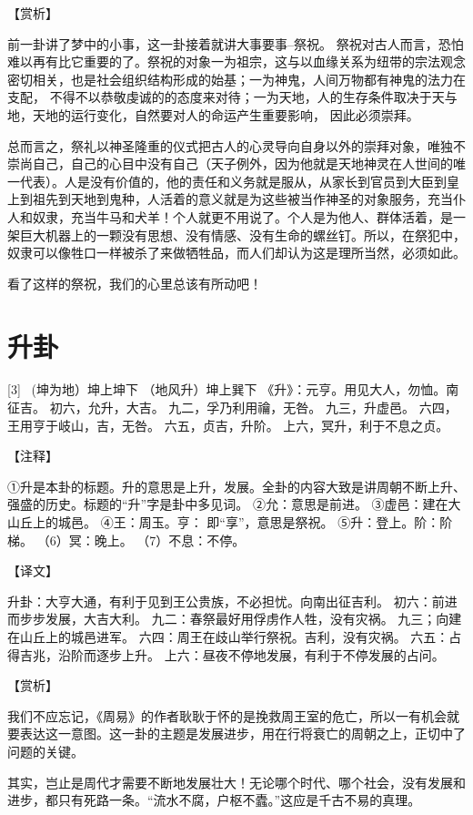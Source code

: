 \documentclass[12pt,UTF8]{ctexbook}
\begin{document}
【赏析】

前一卦讲了梦中的小事，这一卦接着就讲大事要事--祭祝。 祭祝对古人而言，恐怕难以再有比它重要的了。祭祝的对象一为祖宗，这与以血缘关系为纽带的宗法观念密切相关，也是社会组织结构形成的始基；一为神鬼，人间万物都有神鬼的法力在支配， 不得不以恭敬虔诚的的态度来对待；一为天地，人的生存条件取决于天与地，天地的运行变化，自然要对人的命运产生重要影响， 因此必须崇拜。

总而言之，祭礼以神圣隆重的仪式把古人的心灵导向自身以外的崇拜对象，唯独不崇尚自己，自己的心目中没有自己（天子例外，因为他就是天地神灵在人世间的唯一代表）。人是没有价值的，他的责任和义务就是服从，从家长到官员到大臣到皇上到祖先到天地到鬼种，人活着的意义就是为这些被当作神圣的对象服务，充当仆人和奴隶，充当牛马和犬羊！个人就更不用说了。个人是为他人、群体活着，是一架巨大机器上的一颗没有思想、没有情感、没有生命的螺丝钉。所以，在祭犯中，奴隶可以像牲口一样被杀了来做牺牲品，而人们却认为这是理所当然，必须如此。

看了这样的祭祝，我们的心里总该有所动吧！

\chapter{升卦}
[3] \ (坤为地）坤上坤下
（地风升）坤上巽下
《升》：元亨。用见大人，勿恤。南征吉。
初六，允升，大吉。
九二，孚乃利用禴，无咎。
九三，升虚邑。
六四，王用亨于岐山，吉，无咎。
六五，贞吉，升阶。
上六，冥升，利于不息之贞。

【注释】

①升是本卦的标题。升的意思是上升，发展。全卦的内容大致是讲周朝不断上升、强盛的历史。标题的“升”字是卦中多见词。
②允：意思是前进。
③虚邑：建在大山丘上的城邑。
④王：周玉。亨： 即“享”，意思是祭祝。
⑤升：登上。阶：阶梯。
（6）冥：晚上。
（7）不息：不停。

【译文】

升卦：大亨大通，有利于见到王公贵族，不必担忧。向南出征吉利。
初六：前进而步步发展，大吉大利。
九二：春祭最好用俘虏作人牲，没有灾祸。
九三；向建在山丘上的城邑进军。
六四：周王在歧山举行祭祝。吉利，没有灾祸。
六五：占得吉兆，沿阶而逐步上升。
上六：昼夜不停地发展，有利于不停发展的占问。

【赏析】

我们不应忘记，《周易》的作者耿耿于怀的是挽救周王室的危亡，所以一有机会就要表达这一意图。这一卦的主题是发展进步，用在行将衰亡的周朝之上，正切中了问题的关键。

其实，岂止是周代才需要不断地发展壮大！无论哪个时代、哪个社会，没有发展和进步，都只有死路一条。“流水不腐，户枢不蠹。”这应是千古不易的真理。
\end{document}
